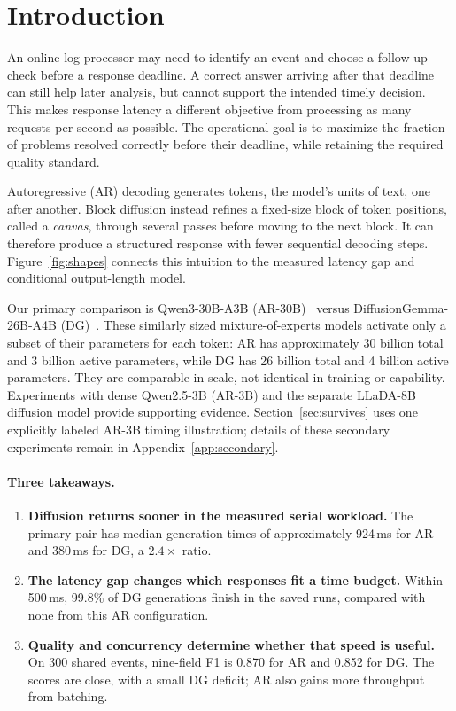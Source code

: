 \section{Introduction}
\label{sec:intro}

An online log processor may need to identify an event and choose a follow-up
check before a response deadline. A correct answer arriving after that
deadline can still help later analysis, but cannot support the intended
timely decision. This makes response latency a different objective from
processing as many requests per second as possible. The operational goal
is to maximize the fraction of problems resolved correctly before their
deadline, while retaining the required quality standard.

Autoregressive (AR) decoding generates tokens, the model's units of text,
one after another. Block diffusion instead refines a fixed-size block of
token positions, called a \emph{canvas}, through several passes before
moving to the next block. It can therefore produce a structured response
with fewer sequential decoding steps. Figure~\ref{fig:shapes} connects this
intuition to the measured latency gap and conditional output-length model.

Our primary comparison is Qwen3-30B-A3B (AR-30B)~\cite{qwen3} versus
DiffusionGemma-26B-A4B (DG)~\cite{diffusiongemma}. These similarly sized mixture-of-experts
models activate only a subset of their parameters for each token:
AR has approximately 30 billion total and 3 billion active parameters,
while DG has 26 billion total and 4 billion active parameters.
They are comparable in scale, not identical in training or capability.
Experiments with dense Qwen2.5-3B (AR-3B) and the separate LLaDA-8B
diffusion model provide supporting evidence. Section~\ref{sec:survives}
uses one explicitly labeled AR-3B timing illustration; details of these
secondary experiments remain in Appendix~\ref{app:secondary}.

\par\vspace{\baselineskip}
\noindent\begin{minipage}{\linewidth}
\paragraph{Three takeaways.}
\begin{enumerate}
\item \textbf{Diffusion returns sooner in the measured serial workload.}
The primary pair has median generation times of approximately 924\,ms
for AR and 380\,ms for DG, a $2.4\times$ ratio.
\item \textbf{The latency gap changes which responses fit a time budget.}
Within 500\,ms, 99.8\% of DG generations finish in the saved runs,
compared with none from this AR configuration.
\item \textbf{Quality and concurrency determine whether that speed is useful.}
On 300 shared events, nine-field F1 is 0.870 for AR and 0.852 for DG.
The scores are close, with a small DG deficit; AR also gains
more throughput from batching.
\end{enumerate}
\end{minipage}

